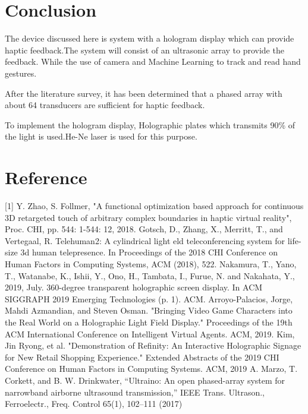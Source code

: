 \documentclass{fisatproject}
\begin{document}
    \chapter{Conclusion}

\par The device discussed here is system with a hologram display which can provide haptic feedback.The system will consist of an ultrasonic array to provide the feedback. While the use of camera and Machine Learning to track and read hand gestures.
\par After the literature survey, it has been determined that a phased array with about 64 transducers are sufficient for haptic feedback.
\par To implement the hologram display, Holographic plates which transmits 90\% of the light is used.He-Ne laser is used for this purpose.


\chapter{Reference}
[1]	Y. Zhao, S. Follmer, "A functional optimization based approach for continuous 3D retargeted touch of arbitrary complex boundaries in haptic virtual reality", Proc. CHI, pp. 544: 1-544: 12, 2018.
\newline
\newline
[2] Gotsch, D., Zhang, X., Merritt, T., and Vertegaal, R. Telehuman2: A cylindrical light eld teleconferencing system for life-size 3d human telepresence. In Proceedings of the 2018 CHI Conference on Human Factors in Computing Systems, ACM (2018), 522.
\newline
\newline
[3] Nakamura, T., Yano, T., Watanabe, K., Ishii, Y., Ono, H., Tambata, I., Furue, N. and Nakahata, Y., 2019, July. 360-degree transparent holographic screen display. In ACM SIGGRAPH 2019 Emerging Technologies (p. 1). ACM.
\newline
\newline
[4] Arroyo-Palacios, Jorge, Mahdi Azmandian, and Steven Osman. "Bringing Video Game Characters into the Real World on a Holographic Light Field Display." Proceedings of the 19th ACM International Conference on Intelligent Virtual Agents. ACM, 2019.
\newline
\newline
[5] Kim, Jin Ryong, et al. "Demonstration of Refinity: An Interactive Holographic Signage for New Retail Shopping Experience." Extended Abstracts of the 2019 CHI Conference on Human Factors in Computing Systems. ACM, 2019
\newline
\newline
[6] A. Marzo, T. Corkett, and B. W. Drinkwater, “Ultraino: An open phased-array system for narrowband airborne ultrasound transmission,” IEEE Trans. Ultrason., Ferroelectr., Freq. Control 65(1), 102–111 (2017)
\end{document}
